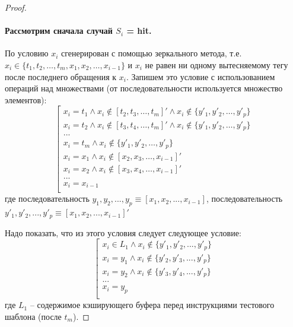 \begin{proof}
  \paragraph{Рассмотрим сначала случай $S_i$ = hit.}
  По условию $x_i$ сгенерирован с помощью зеркального метода, т.е.
  $x_i \in \{t_1, t_2, \dots, t_m, x_1, x_2, \dots, x_{i-1}\}$ и
  $x_i$ не равен ни одному вытесняемому тегу после последнего
  обращения к $x_i$. Запишем это условие с использованием операций
  над множествами (от последовательности используется множество
  элементов):
  \begin{equation}\label{xxxxxx}
  \left[\begin{array}{l}
    x_i = t_1 \wedge x_i \notin [t_2, t_3, \dots, t_m]' \wedge x_i \notin \{y'_1, y'_2, \dots, y'_p\}\\
    x_i = t_2 \wedge x_i \notin [t_3, t_4, \dots, t_m]' \wedge x_i \notin \{y'_1, y'_2, \dots, y'_p\}\\
    ...\\
    x_i = t_m \wedge x_i \notin \{y'_1, y'_2, \dots, y'_p\}\\
    x_i = x_1 \wedge x_i \notin [x_2, x_3, \dots, x_{i-1}]'\\
    x_i = x_2 \wedge x_i \notin [x_3, x_4, \dots, x_{i-1}]'\\
    ...\\
    x_i = x_{i-1}\\
  \end{array}\right.\end{equation}
  где последовательность $y_1, y_2, ..., y_p \equiv [x_1, x_2, ...,
  x_{i-1}]$, последовательность\\ $y'_1, y'_2, ..., y'_p \equiv [x_1,
  x_2, ..., x_{i-1}]'$


  Надо показать, что из этого условия следует следующее условие:
  \begin{equation}\label{yyyyyyyy}
  \left[ \begin{array}{l}
    x_i \in L_1 \wedge x_i \notin \{y'_1, y'_2, ..., y'_p\}\\
    x_i = y_1 \wedge x_i \notin \{y'_2, y'_3, ..., y'_p\}\\
    x_i = y_2 \wedge x_i \notin \{y'_3, y'_4, ..., y'_p\}\\
    ...\\
    x_i = y_p\\
  \end{array}\right.\end{equation}
  где $L_1$ -- содержимое кэширующего буфера перед инструкциями
  тестового шаблона (после $t_m$).


\end{proof}
